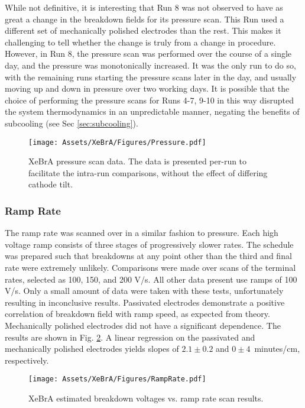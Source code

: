 While not definitive, it is interesting that Run 8 was not observed to have as great a change in the breakdown fields for its pressure scan.
This Run used a different set of mechanically polished electrodes than the rest.
This makes it challenging to tell whether the change is truly from a change in procedure.
However, in Run 8, the pressure scan was performed over the course of a single day, and the pressure was monotonically increased.
It was the only run to do so, with the remaining runs starting the pressure scans later in the day, and usually moving up and down in pressure over two working days.
It is possible that the choice of performing the pressure scans for Runs 4-7, 9-10 in this way disrupted the system thermodynamics in an unpredictable manner, negating the benefits of subcooling (see Sec \ref{sec:subcooling}).



\begin{figure}
    \centering
    \texttt{[image: Assets/XeBrA/Figures/Pressure.pdf]}
    \caption[XeBrA pressure scan data. ]%
    {XeBrA pressure scan data. The data is presented per-run to facilitate the intra-run comparisons, without the effect of differing cathode tilt.}
    \label{fig:pressure scans}
\end{figure}

\subsubsection{Ramp Rate}

The ramp rate was scanned over in a similar fashion to pressure.
Each high voltage ramp consists of three stages of progressively slower rates.
The schedule was prepared such that breakdowns at any point other than the third and final rate were extremely unlikely.
Comparisons were made over scans of the terminal rates, selected as 100, 150, and 200 V/s.
All other data present use ramps of 100 V/s.
Only a small amount of data were taken with these tests, unfortunately resulting in inconclusive results.
Passivated electrodes demonstrate a positive correlation of breakdown field with ramp speed, as expected from theory.
Mechanically polished electrodes did not have a significant dependence.
The results are shown in Fig. \ref{fig:ramp_rate_scans}.
A linear regression on the passivated and mechanically polished electrodes yields slopes of $2.1\pm0.2$ and $0\pm 4$~minutes/cm, respectively.

\begin{figure}
    \centering
    \texttt{[image: Assets/XeBrA/Figures/RampRate.pdf]}
    \caption{XeBrA estimated breakdown voltages vs. ramp rate scan results.}
    \label{fig:ramp_rate_scans}
\end{figure}

